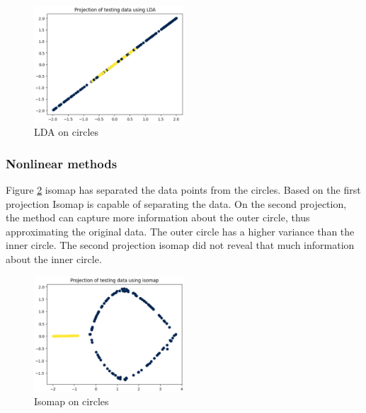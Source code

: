\begin{figure}[htb!]
    \centering
    \includegraphics[width=0.5\textwidth]{figures/theory-example-figures/circles-lda.png}
    \caption{LDA on circles}
    \label{fig:circles-lda}
    \end{figure}
    
\subsubsection{Nonlinear methods}\label{subsubsec:nonlinear-methods-on-circles}
Figure \ref{fig:circles-isomap} \gls{isomap} has separated the data points from the circles. Based on the first projection Isomap is capable of separating the data. On the second projection, the method can capture more information about the outer circle, thus approximating the original data. The outer circle has a higher variance than the inner circle. The second projection \gls{isomap} did not reveal that much information about the inner circle.
\begin{figure}[htb!]
    \centering
    \includegraphics[width=0.5\textwidth]{figures/theory-example-figures/circles-isomap.png}
    \caption{Isomap on circles}
    \label{fig:circles-isomap}
\end{figure}


